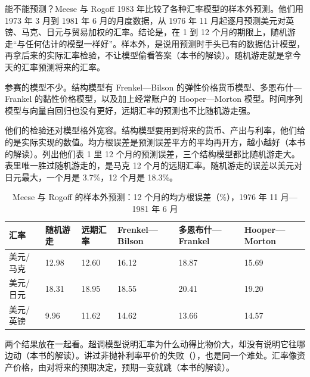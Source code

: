 能不能预测？Meese 与 Rogoff 1983 年比较了各种汇率模型的样本外预测\cite{meeserogoff1983}。他们用 1973 年 3 月到 1981 年 6 月的月度数据，从 1976 年 11 月起逐月预测美元对英镑、马克、日元与贸易加权的汇率\cite{meeserogoff1983}。结论是，在 1 到 12 个月的期限上，随机游走“与任何估计的模型一样好”\cite{meeserogoff1983}。样本外，是说用预测时手头已有的数据估计模型，再拿后来的实际汇率检验，不让模型偷看答案（本书的解读）。随机游走就是拿今天的汇率预测将来的汇率。

参赛的模型不少。结构模型有 Frenkel—Bilson 的弹性价格货币模型、多恩布什—Frankel 的黏性价格模型，以及加上经常账户的 Hooper—Morton 模型\cite{meeserogoff1983}。时间序列模型与向量自回归也没有更好，远期汇率的预测也不比随机游走强\cite{meeserogoff1983}。

他们的检验还对模型格外宽容。结构模型要用到将来的货币、产出与利率，他们给的是实际实现的数值\cite{meeserogoff1983}。均方根误差是预测误差平方的平均再开方，越小越好（本书的解读）。列出他们表 1 里 12 个月的预测误差，三个结构模型都比随机游走大\cite{meeserogoff1983}。表里唯一胜过随机游走的，是马克 12 个月的远期汇率\cite{meeserogoff1983}。随机游走的误差以美元对日元最大，一个月是 3.7\%，12 个月是 18.3\%\cite{meeserogoff1983}。

\begin{table}[tbp]\centering\small
\caption{Meese 与 Rogoff 的样本外预测：12 个月的均方根误差（\%），1976 年 11 月—1981 年 6 月}\label{tab:floating-mr}
\begin{tabularx}{\linewidth}{@{}lYYYYY@{}}
\toprule
汇率 & 随机游走 & 远期汇率 & Frenkel—Bilson & 多恩布什—Frankel & Hooper—Morton\\
\midrule
美元/马克 & 12.98 & 12.60 & 16.12 & 18.87 & 15.69\\
美元/日元 & 18.31 & 18.95 & 18.55 & 20.41 & 19.20\\
美元/英镑 & 9.96 & 11.62 & 14.62 & 13.66 & 14.57\\
\bottomrule
\end{tabularx}
\end{table}

两个结果放在一起看。超调模型说明汇率为什么动得比物价大，却没有说明它往哪边动（本书的解读）。讲过非抛补利率平价的失败（），也是同一个难处。汇率像资产价格，由对将来的预期决定，预期一变就跳（本书的解读）。

